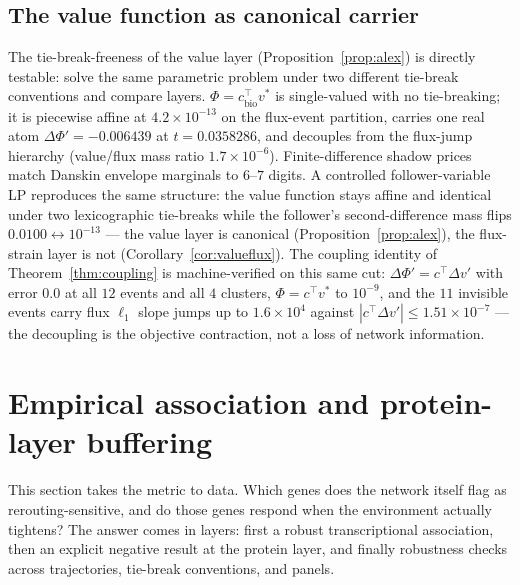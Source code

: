 \documentclass[11pt,a4paper]{article}
\theoremstyle{plain}
\theoremstyle{definition}
\theoremstyle{remark}
\begin{document}
\subsection{The value function as canonical carrier}
\label{sec:v1}
The tie-break-freeness of the value layer
(Proposition~\ref{prop:alex}) is directly testable: solve the same
parametric problem under two different tie-break conventions and
compare layers. $\Phi = c_{\mathrm{bio}}^\top v^*$ is single-valued
with no tie-breaking; it is piecewise affine at $4.2 \times 10^{-13}$
on the flux-event partition, carries one real atom
$\Delta\Phi' = -0.006439$ at $t = 0.0358286$, and decouples from the
flux-jump hierarchy (value/flux mass ratio $1.7 \times 10^{-6}$).
Finite-difference shadow prices match Danskin envelope marginals to
$6$--$7$ digits. A controlled follower-variable LP reproduces the
same structure: the value function stays affine and identical under
two lexicographic tie-breaks while the follower's second-difference
mass flips $0.0100 \leftrightarrow 10^{-13}$ --- the value layer is
canonical (Proposition~\ref{prop:alex}), the flux-strain layer is not
(Corollary~\ref{cor:valueflux}). The coupling identity of
Theorem~\ref{thm:coupling} is machine-verified on this same cut:
$\Delta\Phi' = c^\top \Delta v'$ with error $0.0$ at all $12$
events and all $4$ clusters, $\Phi = c^\top v^*$ to $10^{-9}$, and
the $11$ invisible events carry flux $\ell_1$ slope jumps up to
$1.6 \times 10^{4}$ against $|c^\top \Delta v'| \le 1.51 \times
10^{-7}$ --- the decoupling is the objective contraction, not a loss
of network information.

\section{Empirical association and protein-layer buffering}
\label{sec:empirical}

This section takes the metric to data. Which genes does the network
itself flag as rerouting-sensitive, and do those genes respond when
the environment actually tightens? The answer comes in layers: first
a robust transcriptional association, then an explicit negative
result at the protein layer, and finally robustness checks across
trajectories, tie-break conventions, and panels.
\end{document}
